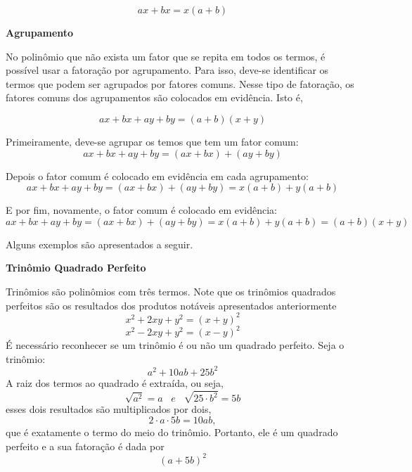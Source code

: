 	\[
	ax + bx = x(a+b)
	\]

        \begin{texample}
        \centering
        \end{texample}

    \noindent
	\textbf{Agrupamento}
	
	No polinômio que não exista um fator que se repita em todos os termos, é possível usar a fatoração por agrupamento. Para isso, deve-se identificar os termos que podem ser agrupados por fatores comuns. Nesse tipo de fatoração, os fatores comuns dos agrupamentos são colocados em evidência. Isto é,
	
	\[
	ax + bx + ay + by = (a + b)(x +y)
	\]
 
	Primeiramente, deve-se agrupar os temos que tem um fator comum:
	\[
	ax + bx + ay + by = (ax + bx) + (ay + by)
	\]
 
	Depois o fator comum é colocado em evidência em cada agrupamento:
	\[
	ax + bx + ay + by = (ax + bx) + (ay + by) = x(a + b) + y(a + b)
	\]
 
	E por fim, novamente, o fator comum é colocado em evidência:
	\[
	ax + bx + ay + by = (ax + bx) + (ay + by) = x(a + b) + y(a + b) = (a + b)(x +y)
	\]
	
	Alguns exemplos são apresentados a seguir.

        \begin{texample}
        \centering
        \end{texample}

    \noindent
	\textbf{Trinômio Quadrado Perfeito}
	
	Trinômios são polinômios com três termos. Note que os trinômios quadrados perfeitos são os resultados dos produtos notáveis apresentados anteriormente
	\[
	x^2 + 2xy + y^2 = (x + y)^2
	\]
	\[
	x^2 - 2xy + y^2 = (x - y)^2
	\]
	É necessário reconhecer se um trinômio é ou não um quadrado perfeito. Seja o trinômio:
	\[
	a^2 +10ab + 25b^2
	\]
	A raiz dos termos ao quadrado é extraída, ou seja,
	\[
	\sqrt{a^2} = a \;\;\; e \;\;\; \sqrt{25 \cdot b^2} = 5b
	\]
	esses dois resultados são multiplicados por dois,
	\[
	2 \cdot a \cdot 5b = 10ab,
	\]
	que é exatamente o termo do meio do trinômio. Portanto, ele é um quadrado perfeito e a sua fatoração é dada por
	\[
	(a + 5b)^2
	\]


